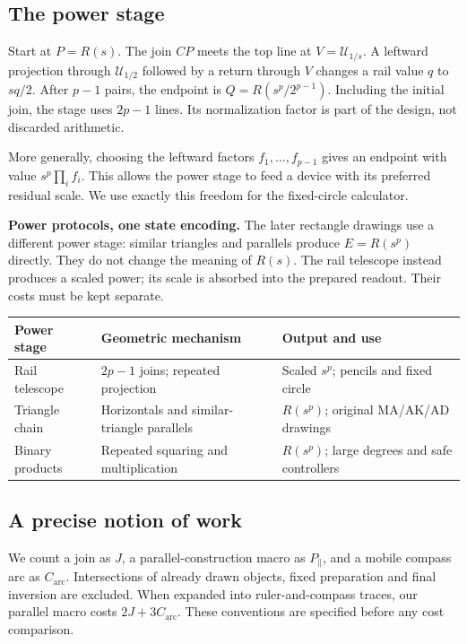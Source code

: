 \documentclass[11pt,a4paper]{article}
\newcommand{\hub}[1]{\mathcal U_{#1}}
\begin{document}
\subsection{The power stage}
Start at $P=R(s)$. The join $CP$ meets the top line at $V=\hub{1/s}$. A leftward projection through $\hub{1/2}$ followed by a return through $V$ changes a rail value $q$ to $sq/2$. After $p-1$ pairs, the endpoint is $Q=R(s^p/2^{p-1})$. Including the initial join, the stage uses $2p-1$ lines. Its normalization factor is part of the design, not discarded arithmetic.

More generally, choosing the leftward factors $f_1,\ldots,f_{p-1}$ gives an endpoint with value $s^p\prod_i f_i$. This allows the power stage to feed a device with its preferred residual scale. We use exactly this freedom for the fixed-circle calculator.


\textbf{Power protocols, one state encoding.} The later rectangle drawings use a different power stage: similar triangles and parallels produce $E=R(s^p)$ directly. They do not change the meaning of $R(s)$. The rail telescope instead produces a scaled power; its scale is absorbed into the prepared readout. Their costs must be kept separate.
\begin{center}\small
\begin{tabularx}{\linewidth}{@{}lXX@{}}\toprule
Power stage & Geometric mechanism & Output and use\\\midrule
Rail telescope & $2p-1$ joins; repeated projection & Scaled $s^p$; pencils and fixed circle\\
Triangle chain & Horizontals and similar-triangle parallels & $R(s^p)$; original MA/AK/AD drawings\\
Binary products & Repeated squaring and multiplication & $R(s^p)$; large degrees and safe controllers\\\bottomrule
\end{tabularx}\end{center}

\subsection{A precise notion of work}
We count a join as $J$, a parallel-construction macro as $P_{\parallel}$, and a mobile compass arc as $C_{\mathrm{arc}}$. Intersections of already drawn objects, fixed preparation and final inversion are excluded. When expanded into ruler-and-compass traces, our parallel macro costs $2J+3C_{\mathrm{arc}}$. These conventions are specified before any cost comparison.
\end{document}
